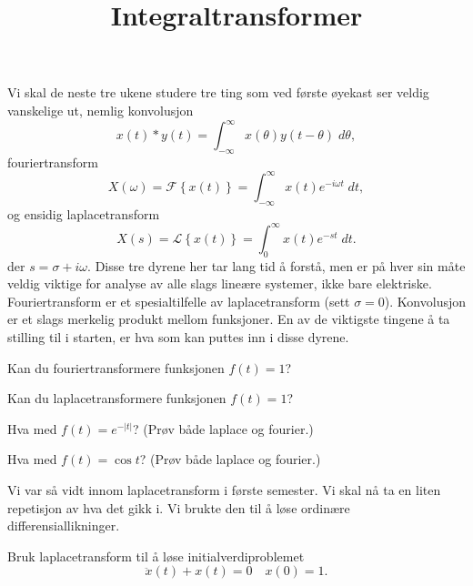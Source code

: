 \documentclass[a4paper,norsk,11pt]{interaktiv}
\title{Integraltransformer}
\begin{document}

\maketitle


Vi skal de neste tre ukene studere tre ting som ved første øyekast ser veldig vanskelige ut,
nemlig konvolusjon
\[
x(t)\ast y(t) = \int_{-\infty}^{\infty} x(\theta) y(t-\theta)\; d\theta,
\]
fouriertransform
\[
X(\omega) = \mathcal{F}\left\{ x(t) \right\}=\int_{-\infty}^{\infty} x(t)e^{-i\omega t}\;dt,
\]
og ensidig laplacetransform
\[
X(s)= \mathcal{L}\left\{ x(t) \right\}=\int_0^{\infty} x(t)e^{-st}\; dt.
\]
der $s=\sigma + i \omega$.
Disse tre dyrene her tar lang tid å forstå, 
men er på hver sin måte veldig viktige for analyse av alle slags lineære systemer, 
ikke bare elektriske.
Fouriertransform er et spesialtilfelle av laplacetransform (sett $\sigma=0$).
Konvolusjon er et slags merkelig produkt mellom funksjoner. 
En av de viktigste tingene å ta stilling til i starten,
er hva som kan puttes inn i disse dyrene. 

\begin{oppgave}{1}
Kan du fouriertransformere funksjonen $f(t)=1$?
\end{oppgave}

\begin{oppgave}{2}
Kan du laplacetransformere funksjonen $f(t)=1$?
\end{oppgave}

\begin{oppgave}{3}
Hva med $f(t)=e^{-|t|}$? (Prøv både laplace og fourier.)
\end{oppgave}

\begin{oppgave}{4}
Hva med $f(t)=\cos t$? (Prøv både laplace og fourier.)
\end{oppgave}


Vi var så vidt innom laplacetransform i første semester. 
Vi skal nå ta en liten repetisjon av hva det gikk i.
Vi brukte den til å løse ordinære differensiallikninger.

\begin{oppgave}{5}
Bruk laplacetransform til å løse initialverdiproblemet
\[
\ddot{x}(t)+x(t)=0 \quad x(0)=1.
\]
\end{oppgave}
\end{document}
